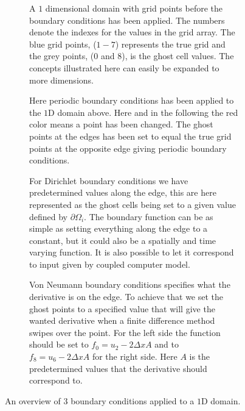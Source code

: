 	\begin{figure}
		\centering
		\begin{subfigure}[b]{0.9\textwidth}
			\centering
			
			\caption{A \(1\) dimensional domain with grid points before the boundary conditions has been applied.
			The numbers denote the indexes for the values in the grid array. The blue grid points, (\(1-7\)) represents
			the true grid and the grey points, ($0$ and $8$), is the ghost cell values. The concepts illustrated here can easily be
			expanded to more dimensions.}
			\label{fig:initial}
		\end{subfigure}
		\begin{subfigure}[b]{0.9\textwidth}
			\centering
			
			\caption{Here periodic boundary conditions has been applied to the \(1\)D domain above. Here and in the following the
			red color means a point has been changed. The ghost points at the edges has been set to equal the
			true grid points at the opposite edge giving periodic boundary conditions.}
			\label{fig:periodic}
		\end{subfigure}
		\begin{subfigure}[b]{0.9\textwidth}
			\centering
			
			\caption{For Dirichlet boundary conditions we have predetermined values along the edge, this are here represented as the ghost cells
			being set to a given value defined by \(\partial\Omega_i\). The boundary function can be as simple as setting everything along
			the edge to a constant, but it could also be a spatially and time varying function. It is also possible to let it correspond to
			input given by coupled computer model.}
			\label{fig:dirichlet}
		\end{subfigure}
		\begin{subfigure}[b]{0.9\textwidth}
			\centering
			
			\caption{Von Neumann boundary conditions specifies what the derivative is on the edge. To achieve that we set the ghost points to
			a specified value that will give the wanted derivative when a finite difference method swipes over the point. For the left side
			the function should be set to \(f_0 = u_2 - 2\Delta x A\) and to \(f_8 = u_6 - 2\Delta x A\) for the right side. Here \(A\) is the
			predetermined values that the derivative should correspond to.}
			\label{fig:neumann}
		\end{subfigure}
		\caption{An overview of 3 boundary conditions applied to a \(1\)D domain.}
		\label{fig:bnd}
	\end{figure}



